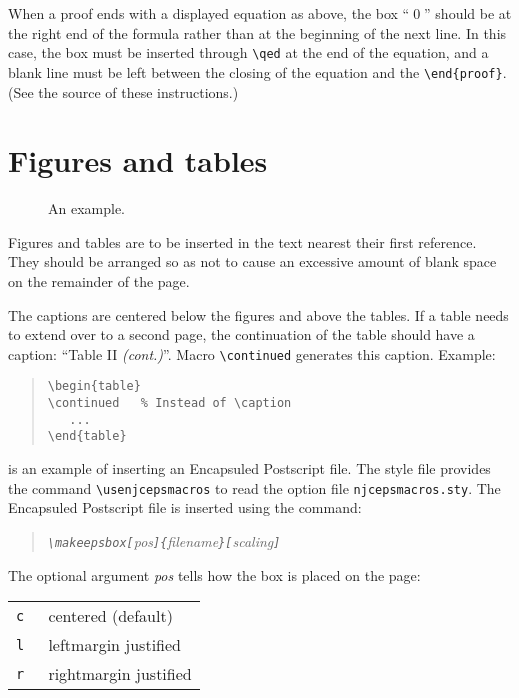 When a proof ends with a displayed equation as above,
the box ``\qed'' should be at the right end of the formula
rather than at the beginning of the next line.
In this case, the box must be inserted through
\verb|\qed| at the end of the equation, and a blank line
must be left between the closing of the equation and the \verb|\end{proof}|.
(See the source of these instructions.)

\section{Figures and tables}

\begin{figure}[t]
\caption{An example.}
\label{fig:example}
\end{figure}

Figures and tables are to be inserted in the text nearest their first reference.
They should be arranged so as not to cause an excessive amount of
blank space on the remainder of the page. 

The captions are centered below the figures and above the tables.
If a table needs to extend over to a second page, the continuation of the
table should have a caption: ``Table II {\em (cont.)}''.
Macro \verb|\continued| generates this caption.
Example:
\begin{quote}
   \verb|\begin{table}|\\
   \verb|\continued   % Instead of \caption|\\
   \verb|   ...|\\
   \verb|\end{table}|
\end{quote}

 is an example of inserting an Encapsuled Postscript file.
The style file provides the command \verb|\usenjcepsmacros| to read
the option file {\tt njcepsmacros.sty}.
The Encapsuled Postscript file is inserted using the command:
\begin{quotation}\em
\verb|\makeepsbox[|pos\/\verb|]{|filename\/\verb|}[|scaling\verb|]|
\end{quotation}
The optional argument {\em pos\/} tells how the box is placed on the page:\\
\begin{tabular}{cl}
\tt c &  centered (default)\\
\tt l & leftmargin justified \\
\tt r & rightmargin justified
\end{tabular}

